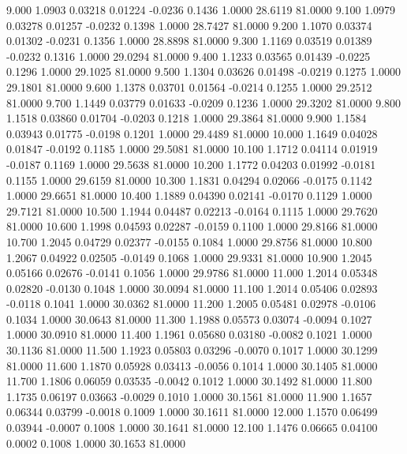    9.000   1.0903   0.03218   0.01224  -0.0236   0.1436   1.0000  28.6119  81.0000
   9.100   1.0979   0.03278   0.01257  -0.0232   0.1398   1.0000  28.7427  81.0000
   9.200   1.1070   0.03374   0.01302  -0.0231   0.1356   1.0000  28.8898  81.0000
   9.300   1.1169   0.03519   0.01389  -0.0232   0.1316   1.0000  29.0294  81.0000
   9.400   1.1233   0.03565   0.01439  -0.0225   0.1296   1.0000  29.1025  81.0000
   9.500   1.1304   0.03626   0.01498  -0.0219   0.1275   1.0000  29.1801  81.0000
   9.600   1.1378   0.03701   0.01564  -0.0214   0.1255   1.0000  29.2512  81.0000
   9.700   1.1449   0.03779   0.01633  -0.0209   0.1236   1.0000  29.3202  81.0000
   9.800   1.1518   0.03860   0.01704  -0.0203   0.1218   1.0000  29.3864  81.0000
   9.900   1.1584   0.03943   0.01775  -0.0198   0.1201   1.0000  29.4489  81.0000
  10.000   1.1649   0.04028   0.01847  -0.0192   0.1185   1.0000  29.5081  81.0000
  10.100   1.1712   0.04114   0.01919  -0.0187   0.1169   1.0000  29.5638  81.0000
  10.200   1.1772   0.04203   0.01992  -0.0181   0.1155   1.0000  29.6159  81.0000
  10.300   1.1831   0.04294   0.02066  -0.0175   0.1142   1.0000  29.6651  81.0000
  10.400   1.1889   0.04390   0.02141  -0.0170   0.1129   1.0000  29.7121  81.0000
  10.500   1.1944   0.04487   0.02213  -0.0164   0.1115   1.0000  29.7620  81.0000
  10.600   1.1998   0.04593   0.02287  -0.0159   0.1100   1.0000  29.8166  81.0000
  10.700   1.2045   0.04729   0.02377  -0.0155   0.1084   1.0000  29.8756  81.0000
  10.800   1.2067   0.04922   0.02505  -0.0149   0.1068   1.0000  29.9331  81.0000
  10.900   1.2045   0.05166   0.02676  -0.0141   0.1056   1.0000  29.9786  81.0000
  11.000   1.2014   0.05348   0.02820  -0.0130   0.1048   1.0000  30.0094  81.0000
  11.100   1.2014   0.05406   0.02893  -0.0118   0.1041   1.0000  30.0362  81.0000
  11.200   1.2005   0.05481   0.02978  -0.0106   0.1034   1.0000  30.0643  81.0000
  11.300   1.1988   0.05573   0.03074  -0.0094   0.1027   1.0000  30.0910  81.0000
  11.400   1.1961   0.05680   0.03180  -0.0082   0.1021   1.0000  30.1136  81.0000
  11.500   1.1923   0.05803   0.03296  -0.0070   0.1017   1.0000  30.1299  81.0000
  11.600   1.1870   0.05928   0.03413  -0.0056   0.1014   1.0000  30.1405  81.0000
  11.700   1.1806   0.06059   0.03535  -0.0042   0.1012   1.0000  30.1492  81.0000
  11.800   1.1735   0.06197   0.03663  -0.0029   0.1010   1.0000  30.1561  81.0000
  11.900   1.1657   0.06344   0.03799  -0.0018   0.1009   1.0000  30.1611  81.0000
  12.000   1.1570   0.06499   0.03944  -0.0007   0.1008   1.0000  30.1641  81.0000
  12.100   1.1476   0.06665   0.04100   0.0002   0.1008   1.0000  30.1653  81.0000
